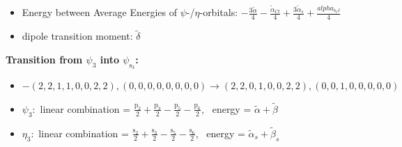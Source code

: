 \documentclass[12pt,a4paper]{article}
\begin{document}
\begin{itemize}
                \item Energy between Average Energies of $\psi$-/$\eta$-orbitals: $- \frac{3 \tilde{\alpha}}{4} - \frac{\tilde{\alpha}_{Cl}}{4} + \frac{3 \tilde{\alpha}_{s}}{4} + \frac{alpha_{\text{s}_Cl}}{4}$
            
            \item dipole transition moment: $\tilde{\delta}$
        
        \end{itemize}
        

        \noindent\textbf{Transition from $\psi_{3}$ into $\psi_{\text{s}_{3}}$:}
        \begin{itemize}
            \item $- (2, 2, 1, 1, 0, 0, 2, 2), (0, 0, 0, 0, 0, 0, 0, 0) \rightarrow (2, 2, 0, 1, 0, 0, 2, 2), (0, 0, 1, 0, 0, 0, 0, 0)$
        
            \item $\psi_{3}:$ linear combination = $\frac{\text{p}_{2}}{2} + \frac{\text{p}_{3}}{2} - \frac{\text{p}_{5}}{2} - \frac{\text{p}_{6}}{2}$, \
            energy = $\tilde{\alpha} + \tilde{\beta}$
            
            \item $\eta_{3}:$ linear combination = $\frac{\text{s}_{2}}{2} + \frac{\text{s}_{3}}{2} - \frac{\text{s}_{5}}{2} - \frac{\text{s}_{6}}{2}$, \
            energy = $\tilde{\alpha}_{s} + \tilde{\beta}_{s}$
            

\end{itemize}
\end{document}
